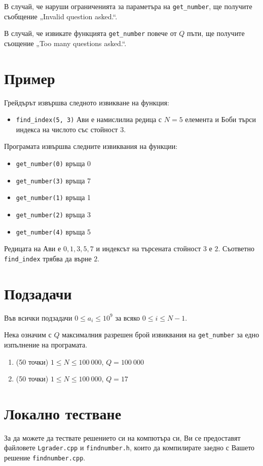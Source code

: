 \documentclass[a4paper,11pt]{article}
\newcommand{\code}[1]{\texttt{#1}}
\newcommand{\noskip}{\vspace{-\parskip}}
\begin{document}
В случай, че наруши ограниченията за параметъра на \code{get\_number}, ще
получите съобщение „Invalid question asked.“.

В случай, че извикате функцията \code{get\_number} повече от $Q$ пъти, ще
получите съощение „Too many questions asked.“.

\section*{Пример}
Грейдърът извършва следното извикване на функция:
\noskip
\begin{itemize}
    \item \code{find\_index(5, 3)} Ави е намислилиа редица с $N=5$ елемента и
        Боби търси индекса на числото със стойност $3$.
\end{itemize}
Програмата извършва следните извиквания на функции:
\noskip
\begin{itemize}
    \item \code{get\_number(0)} връща 0
    \item \code{get\_number(3)} връща 7
    \item \code{get\_number(1)} връща 1
    \item \code{get\_number(2)} връща 3
    \item \code{get\_number(4)} връща 5
\end{itemize}

Редицата на Ави е $0, 1, 3, 5, 7$ и индексът на търсената стойност $3$ е $2$.
Съответно \code{find\_index} трябва да върне $2$.

\section*{Подзадачи}
Във всички подзадачи $0 \leq a_i \leq 10^9$ за всяко $0 \leq i \leq N - 1$.

Нека означим с $Q$ максималния разрешен брой извиквания на \code{get\_number} за
едно изпълнение на програмата.
\noskip
\begin{enumerate}
    \item (50 точки) $1 \leq N \leq 100\ 000$, $Q = 100\ 000$
    \item (50 точки) $1 \leq N \leq 100\ 000$, $Q = 17$
\end{enumerate}
\section*{Локално тестване}
За да можете да тествате решението си на компютъра си, Ви се предоставят
файловете \code{Lgrader.cpp} и \code{findnumber.h}, които да компилирате
заедно с Вашето решение \code{findnumber.cpp}.
\end{document}
